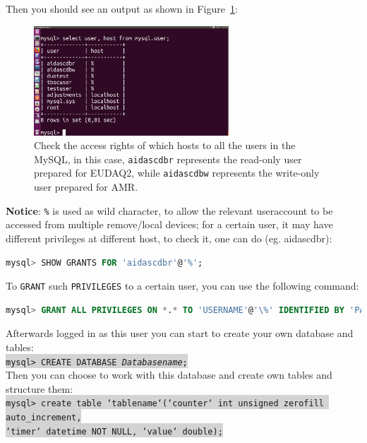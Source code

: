 \documentclass[a4paper,12pt]{scrartcl}
\begin{document}
Then you should see an output as shown in Figure~\ref{fig:mysql-user}:
\begin{figure}[!ht] \centering
\includegraphics[trim={2cm 7cm 0cm 3cm},clip,width=0.65\textwidth]{mysqluser.png}
\caption{Check the access rights of which hosts to all the users in the MySQL, in this case, \texttt{aidascdbr} represents the read-only user prepared for EUDAQ2, while \texttt{aidascdbw} represents the write-only user prepared for AMR.}
\label{fig:mysql-user}
\end{figure}

\textbf{Notice}: \texttt{\%} is used as wild character, to allow the relevant useraccount to be accessed from multiple remove/local devices; for a certain user, it may have different privileges at different host, to check it, one can do (eg. aidascdbr):
\begin{lstlisting}[language=SQL]
mysql> SHOW GRANTS FOR 'aidascdbr'@'%';
\end{lstlisting}

To \texttt{GRANT} such \texttt{PRIVILEGES} to a certain user, you can use the following command:
\begin{lstlisting}[language=SQL]
mysql> GRANT ALL PRIVILEGES ON *.* TO 'USERNAME'@'\%' IDENTIFIED BY 'PASSWORD';
\end{lstlisting}

Afterwards logged in as this user you can start to create your own database and tables: \\
\colorbox{lightgray}{\texttt{mysql> CREATE DATABASE \textit{Databasename};}}\\
Then you can choose to work with this database and create own tables and structure them: \\
\colorbox{lightgray}{\texttt{mysql> create table `tablename`(`counter` int unsigned zerofill auto\_increment,}}\\
\colorbox{lightgray}{\texttt{`timer` datetime NOT NULL, `value` double);}}\\
\end{document}
